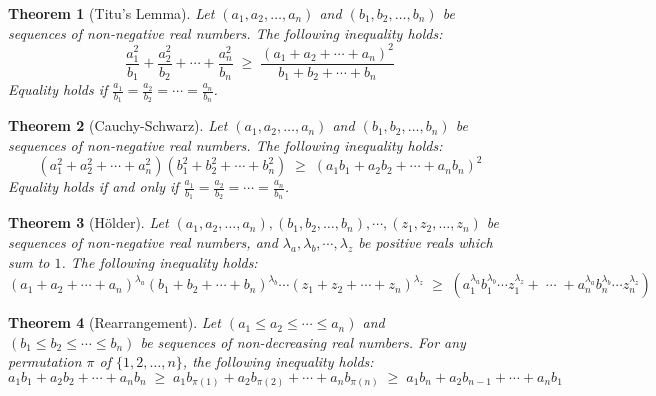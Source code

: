 \documentclass[11pt, reqno]{article}
\newtheorem{theorem}{Theorem}
\begin{document}
\begin{theorem}[Titu's Lemma]
Let $(a_1, a_2, \dots, a_n)$ and $(b_1, b_2, \dots, b_n)$ be sequences of non-negative real numbers. The following inequality holds:
\begin{equation*}
	\dfrac{a_1^2}{b_1} + \dfrac{a_2^2}{b_2} + \cdots + \dfrac{a_n^2}{b_n}	\;\geq\;		\dfrac{(a_1 + a_2 + \cdots + a_n)^2}{b_1 + b_2 + \cdots + b_n}
\end{equation*}
Equality holds if $\frac{a_1}{b_1} = \frac{a_2}{b_2} = \cdots = \frac{a_n}{b_n}$.
\end{theorem}

\begin{theorem}[Cauchy-Schwarz]
Let $(a_1, a_2, \dots, a_n)$ and $(b_1, b_2, \dots, b_n)$ be sequences of non-negative real numbers. The following inequality holds:
\begin{equation*}
	(a_1^2 + a_2^2 + \cdots + a_n^2)(b_1^2 + b_2^2 + \cdots + b_n^2)	\;\geq\;		(a_1b_1 + a_2b_2 + \cdots + a_nb_n)^2
\end{equation*}
Equality holds if and only if $\frac{a_1}{b_1} = \frac{a_2}{b_2} = \cdots = \frac{a_n}{b_n}$.
\end{theorem}

\begin{theorem}[H\"{o}lder]
Let $(a_1, a_2, \dots, a_n),(b_1, b_2, \dots, b_n),\cdots,(z_1, z_2, \dots, z_n)$ be sequences of non-negative real numbers,
and $\lambda_a, \lambda_b, \cdots, \lambda_z$ be positive reals which sum to $1$. The following inequality holds:
\begin{equation*}
	(a_1 + a_2 + \cdots + a_n)^{\lambda_a} (b_1 + b_2 + \cdots + b_n)^{\lambda_b} \cdots (z_1 + z_2 + \cdots + z_n)^{\lambda_z}	\;\geq\;
	(a_1^{\lambda_a} b_1^{\lambda_b} \!\cdots\! z_1^{\lambda_z} + \;\cdots\; + a_n^{\lambda_a} b_n^{\lambda_b} \!\cdots\! z_n^{\lambda_z})
\end{equation*}
\end{theorem}

\begin{theorem}[Rearrangement]
Let $(a_1 \leq a_2 \leq \cdots \leq a_n)$ and $(b_1 \leq b_2 \leq \cdots \leq b_n)$ be sequences of non-decreasing real numbers.
For any permutation $\pi$ of $\{1, 2, \dots, n\}$, the following inequality holds:
\begin{equation*}
	a_1b_1 + a_2b_2 + \cdots + a_nb_n	\;\geq\;		a_1b_{\pi(1)} + a_2b_{\pi(2)} + \cdots + a_nb_{\pi(n)}	\;\geq\;
	a_1b_n + a_2b_{n-1} + \cdots + a_nb_1
\end{equation*}
\end{theorem}
\end{document}
